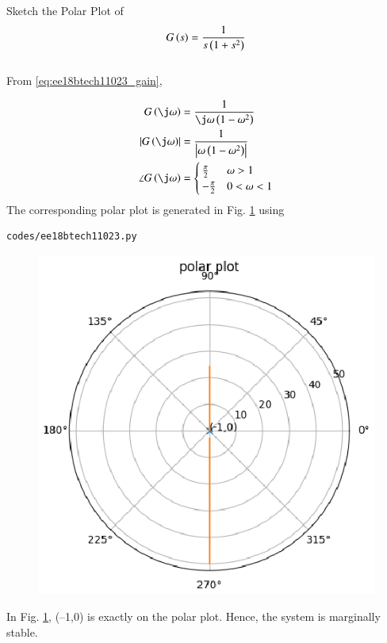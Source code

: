 \item
Sketch the Polar Plot of
\begin{align}
G\left(s\right) = \frac{1}{s\left(1+s^{2}\right)}
\label{eq:ee18btech11023_gain}
\end{align}
\\
\solution  From \eqref{eq:ee18btech11023_gain},

\begin{align}
G\brak{\j\omega} &=   \frac{1}{\j\omega\brak{1-{\omega}^{2}}}
\\
      \abs{G\brak{\j\omega}} &= \frac{1}{\abs{\omega\brak{1-{\omega}^{2}}}}
\\
    \angle G\brak{\j\omega} &= 
\begin{cases}
\frac{\pi}{2} & \omega > 1
\\
-\frac{\pi}{2} & 0 < \omega < 1
\end{cases}
    \end{align}
%
The corresponding polar plot is generated in Fig.   \ref{fig:ee18btech11023} using 
\begin{lstlisting}
codes/ee18btech11023.py
\end{lstlisting}

\begin{figure}[!ht]
\centering
  \includegraphics[width=\columnwidth]{./figs/ee18btech11023/ee18btech11023_1c.eps}
  \caption{}
  \label{fig:ee18btech11023}
\end{figure}
In Fig.   \ref{fig:ee18btech11023},  (–1,0) is exactly on the polar plot.  Hence, the system is marginally stable.


